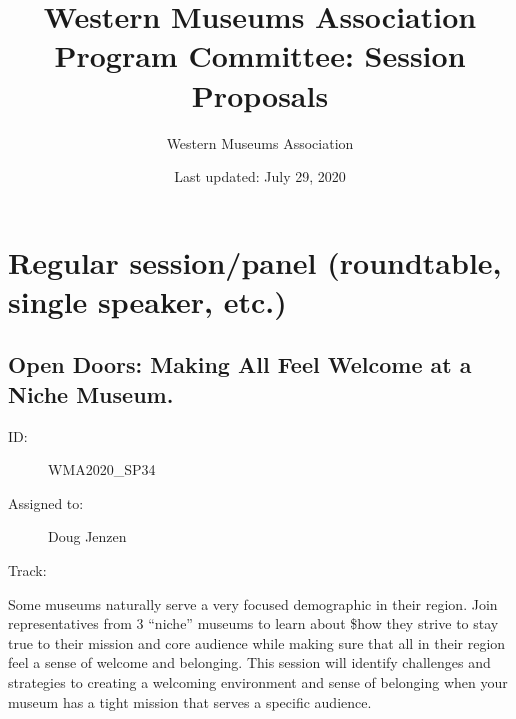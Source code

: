 \documentclass{report}
\title{ Western Museums Association Program Committee: Session Proposals }
\date{ Last updated: July 29, 2020}
\author{Western Museums Association}
\begin{document}
  \maketitle
  \newpage
  \tableofcontents
  \newpage
  
    \newpage
    \chapter*{ Regular session/panel (roundtable, single speaker, etc.) }

      
        
        
        
        
          \newpage
          \section{ Open Doors:  Making All Feel Welcome at a Niche Museum.  }
            \begin{description}
              \item [ID:]
              WMA2020\_SP34

              \item [Assigned to:]Doug Jenzen~
                \item [Track:]
              \end{description}

              Some museums naturally serve a very focused demographic in their region. Join representatives from 3 “niche” museums to learn about \$how they strive to stay true to their mission and core audience while making sure that all in their region feel a sense of welcome and belonging. This session will identify challenges and strategies to creating a welcoming environment and sense of belonging when your museum has a tight mission that serves a specific audience.
\end{document}
